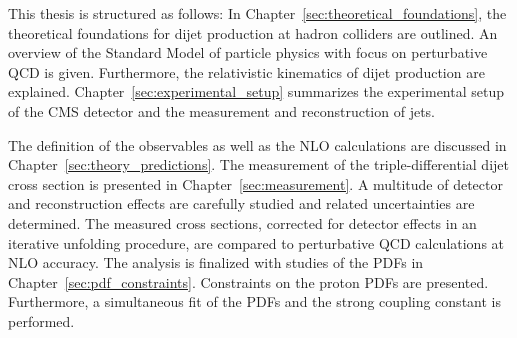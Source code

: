 %
This thesis is structured as follows: In
Chapter~\ref{sec:theoretical_foundations}, the theoretical foundations for dijet
production at hadron colliders are outlined. An overview of the Standard Model
of particle physics with focus on perturbative QCD is given.  Furthermore, the
relativistic kinematics of dijet production are explained.
Chapter~\ref{sec:experimental_setup} summarizes the experimental setup of the
CMS detector and the measurement and reconstruction of jets. 

The definition of the observables as well as the NLO calculations are discussed
in Chapter~\ref{sec:theory_predictions}. The measurement of the
triple-differential dijet cross section is presented in
Chapter~\ref{sec:measurement}. A multitude of detector and reconstruction
effects are carefully studied and related uncertainties are determined. The
measured cross sections, corrected for detector effects in an iterative
unfolding procedure, are compared to perturbative QCD calculations at NLO
accuracy. The analysis is finalized with studies of the PDFs in
Chapter~\ref{sec:pdf_constraints}. Constraints on the proton PDFs are presented.
Furthermore, a simultaneous fit of the PDFs and the strong coupling constant is
performed.

